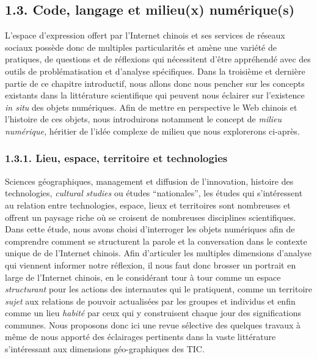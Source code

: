 \bigskip

\subsection[1.3. Code, langage et milieu(x) num\'erique(s)]{1.3. Code, langage et milieu(x) num\'erique(s)}
\hypertarget{RefHeading151699228146}{}{\color{black}
L'espace d'expression offert par l'Internet chinois et ses services de r\'eseaux sociaux poss\`ede donc de multiples
particularit\'es et am\`ene une vari\'et\'e de pratiques, de questions et de r\'eflexions qui n\'ecessitent d'\^etre
\textsf{appr\'ehen}d\'e\textsf{ }avec \textsf{des }outils de probl\'ematisation et \textsf{d'analyse sp\'ecifiques.}
Dans la troisi\`eme et derni\`ere partie de ce chapitre introductif, nous allons donc nous pencher sur les concepts
existants dans la litt\'erature scientifique qui peuvent nous \'eclairer sur l'existence \textit{in situ} des
\textsf{objets num\'eriques}. Afin de mettre en perspective le Web chinois et l'histoire de ces objets, nous
introduirons notamment le concept de \textsf{\textit{milieu num\'erique}}\textit{, }h\'eritier de l'id\'ee complexe de
milieu que nous explorerons ci-apr\`es.}

\subsubsection[1.3.1. Lieu, espace, territoire et technologies]{1.3.1. Lieu, espace, territoire et technologies}
\hypertarget{RefHeading171699228146}{}{\color{black}
Sciences g\'eographiques, management et diffusion de l'innovation, histoire des technologies, \textit{cultural studies
}ou \'etudes ``nationales'', les \'etudes qui s'int\'eressent au relation entre technologies, espace, lieux et
territoires sont nombreuses et offrent un paysage riche o\`u se croisent de nombreuses disciplines scientifiques. Dans
cette \'etude, nous avons choisi d'interroger les objets num\'eriques afin de comprendre comment se structurent la
parole et la conversation dans le contexte unique de de l'Internet chinois. Afin d'articuler les multiples dimensions
d'analyse qui viennent informer notre r\'eflexion, il nous faut donc brosser un portrait en large de l'Internet
chinois, en le consid\'erant tour \`a tour comme un espace \textit{structurant} pour les actions des internautes qui le
pratiquent, comme un territoire \textit{sujet }aux relations de pouvoir actualis\'ees par les groupes et individus et
enfin comme un lieu \textit{habit\'e }par ceux qui y construisent chaque jour des significations communes. Nous
proposons donc ici une revue s\'elective des quelques travaux \`a m\^eme de nous apport\'e des \'eclairages pertinents
dans la vaste litt\'erature s'int\'eressant aux dimensions g\'eo-graphiques des TIC. }



